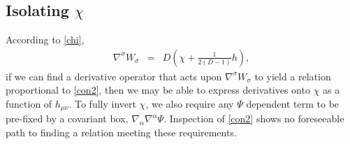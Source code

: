 \documentclass[10pt,letterpaper]{article}
\numberwithin{equation}{section}
\begin{document}
\subsection{Isolating $\chi$}
According to \eqref{chi},
\begin{eqnarray}
\nabla^\sigma W_\sigma &=& D\left( \chi + \frac{1}{2(D-1)}h\right),
\end{eqnarray}
if we can find a derivative operator that acts upon $\nabla^\sigma W_\sigma$ to yield a relation proportional to \eqref{con2}, then we may be able to express derivatives onto $\chi$ as a function of $h_{\mu\nu}$. To fully invert $\chi$, we also require any $\Psi$ dependent term to be pre-fixed by a covariant box, $\nabla_\alpha\nabla^\alpha \Psi$. Inspection of \eqref{con2} shows no foreseeable path to finding a relation meeting these requirements. 

%
%
\end{document}
